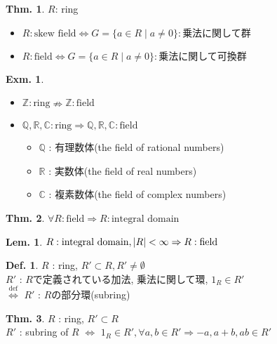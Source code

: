 \documentclass[uplatex,dvipdfmx,9pt]{beamer}
\newcommand{\defarrow}{\overset{\mathrm{def}}{\Leftrightarrow}}
\newcommand{\lt}{\ensuremath <}
\newcommand{\Z}{\mathbb{Z}}
\newcommand{\Q}{\mathbb{Q}}
\newcommand{\R}{\mathbb{R}}
\newcommand{\C}{\mathbb{C}}
\newcounter{textLemCount}
\newcounter{textExmCount}
\theoremstyle{definition} %
\newtheorem{defn}{Def.}[subsection] %
\newtheorem{thm}{Thm.}[subsection] %
\newtheorem{lemText}[textLemCount]{Lem.} %
\theoremstyle{example}
\newtheorem{exmText}[textExmCount]{Exm.}
\begin{document}
\begin{frame}

  \begin{thm}
    $R$: ring
    \begin{itemize}
      \item $R: \text{skew field} \Leftrightarrow G = \{a \in R \mid a \ne 0\} : \text{乗法に関して群}$
      \item $R: \text{field} \Leftrightarrow G = \{a \in R \mid a \ne 0\} : \text{乗法に関して可換群}$
    \end{itemize}
  \end{thm}

  \begin{exmText}
    \begin{itemize}
      \item $\Z : \text{ring} \nRightarrow \Z : \text{field}$
      \item $\Q, \R, \C : \text{ring} \Rightarrow \Q, \R, \C : \text{field}$
            \begin{itemize}
              \item $\Q$ : \alert{有理数体(the field of rational numbers)}
              \item $\R$ : \alert{実数体(the field of real numbers)}
              \item $\C$ : \alert{複素数体(the field of complex numbers)}
            \end{itemize}
    \end{itemize}
  \end{exmText}

\end{frame}

\begin{frame}

  \begin{thm}
    $\forall R : \text{field} \Rightarrow R : \text{integral domain}$
  \end{thm}

  \begin{lemText}
    $R : \text{integral domain}, |R| \lt \infty \Rightarrow R : \text{field}$
  \end{lemText}

  \begin{defn}
    $R$ : ring, $R' \subset R, R' \neq \emptyset$ \\
    $R'$ : $R$で定義されている加法, 乗法に関して環, $1_R \in R'$ \\
    $\defarrow$ $R'$ : $R$の\alert{部分環(subring)}
  \end{defn}

  \begin{thm}
    $R$ : ring, $R' \subset R$ \\
    $R'$ : subring of $R$ $\Leftrightarrow$ $1_R \in R', \forall a, b \in R' \Rightarrow -a, a+b, ab \in R'$
  \end{thm}

\end{frame}
\end{document}

